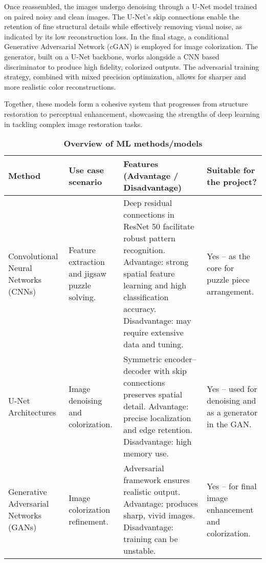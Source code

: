 \documentclass[%
 reprint,
 amsmath,amssymb,
 aps,
]{revtex4-2}
\begin{document}
Once reassembled, the images undergo denoising through a U-Net model trained on paired noisy and clean images. The U-Net's skip connections enable the retention of fine structural details while effectively removing visual noise, as indicated by its low reconstruction loss. In the final stage, a conditional Generative Adversarial Network (cGAN) is employed for image colorization. The generator, built on a U-Net backbone, works alongside a CNN based discriminator to produce high fidelity, colorized outputs. The adversarial training strategy, combined with mixed precision optimization, allows for sharper and more realistic color reconstructions.

Together, these models form a cohesive system that progresses from structure restoration to perceptual enhancement, showcasing the strengths of deep learning in tackling complex image restoration tasks.

\begin{table*}[ht]
    \caption{\textbf{Overview of ML methods/models}}  
    \label{tab:methodsoverview}
    \centering
    \begin{tabular}{|p{3cm}|p{3.5cm}|p{6cm}|p{3cm}|}
    \hline
       \textbf{Method}  &  \textbf{Use case scenario}   &  \textbf{Features (Advantage / Disadvantage)}  &  \textbf{Suitable for the project?}   \\
    \hline
    Convolutional Neural Networks (CNNs)  & Feature extraction and jigsaw puzzle solving. & Deep residual connections in ResNet 50 facilitate robust pattern recognition. Advantage: strong spatial feature learning and high classification accuracy. Disadvantage: may require extensive data and tuning. & Yes -- as the core for puzzle piece arrangement. \\
    \hline

    U-Net Architectures  & Image denoising and colorization. & Symmetric encoder–decoder with skip connections preserves spatial detail. Advantage: precise localization and edge retention. Disadvantage: high memory use. & Yes -- used for denoising and as a generator in the GAN. \\
    \hline
    Generative Adversarial Networks (GANs)  & Image colorization refinement. & Adversarial framework ensures realistic output. Advantage: produces sharp, vivid images. Disadvantage: training can be unstable. & Yes -- for final image enhancement and colorization. \\
    \hline
    \end{tabular}
\end{table*}
\end{document}
